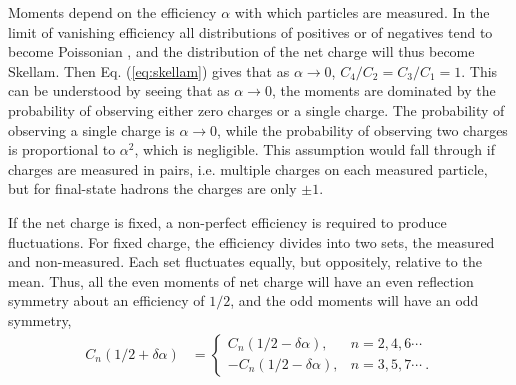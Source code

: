 Moments depend on the efficiency $\alpha$ with which particles are measured. In the limit of vanishing efficiency all distributions of positives or of negatives tend to become Poissonian \cite{Bzdak:2012ab}, and the distribution of the net charge will thus become Skellam. Then Eq. (\ref{eq:skellam}) gives that as $\alpha\rightarrow 0$, $C_4/C_2=C_3/C_1=1$. This can be understood by seeing that as $\alpha\rightarrow 0$, the moments are dominated by the probability of observing either zero charges or a single charge. The probability of observing a single charge is $\alpha\rightarrow 0$, while the probability of observing two charges is proportional to $\alpha^2$, which is negligible. This assumption would fall through if charges are measured in pairs, i.e. multiple charges on each measured particle, but for final-state hadrons the charges are only $\pm 1$.

If the net charge is fixed, a non-perfect efficiency is required to produce fluctuations. For fixed charge, the efficiency divides into two sets, the measured and non-measured. Each set fluctuates equally, but oppositely, relative to the mean. Thus, all the even moments of net charge will have an even reflection symmetry about an efficiency of $1/2$, and the odd moments will have an odd symmetry,
\begin{eqnarray}
\label{eq:alphasymm}
C_n(1/2+\delta\alpha)&=\left\{\begin{array}{rl}
C_n(1/2-\delta\alpha),&n=2,4,6\cdots\\
-C_n(1/2-\delta\alpha),&n=3,5,7\cdots~.\end{array}\right.
\end{eqnarray}
